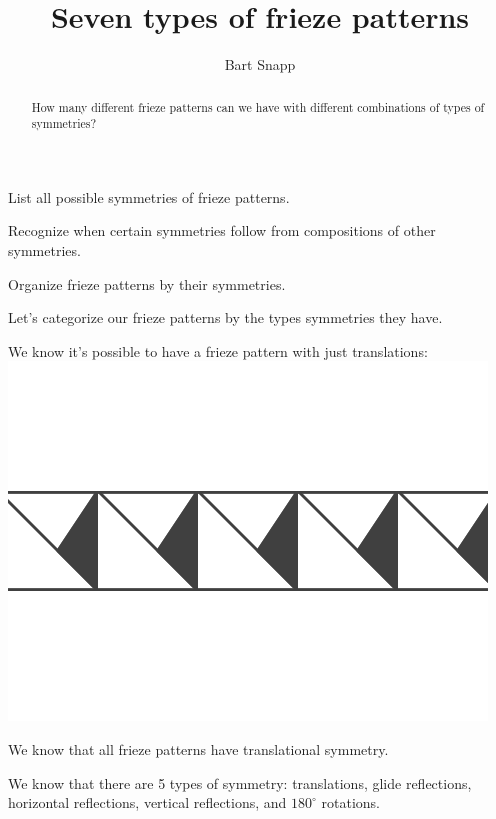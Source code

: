 \documentclass[noauthor,nooutcomes,hints,handout]{../ximera}
\author{Bart Snapp}
\title{Seven types of frieze patterns}
\begin{document}
\begin{abstract}
  How many different frieze patterns can we have with different combinations of  types of symmetries?
\end{abstract}
\maketitle

\begin{listOutcomes}
\item List all possible symmetries of frieze patterns.
\item Recognize when certain symmetries follow from compositions of
  other symmetries.
\item Organize frieze patterns by their symmetries.
\end{listOutcomes}



Let's categorize our frieze patterns by the types symmetries they have. 

We know it's possible to have a frieze pattern with just translations: 
\includegraphics{7T.png}

We know that all frieze patterns have translational symmetry.

We know that there are 5 types of symmetry: translations, glide reflections, horizontal reflections, vertical reflections, and $180^\circ$ rotations.
\end{document}
